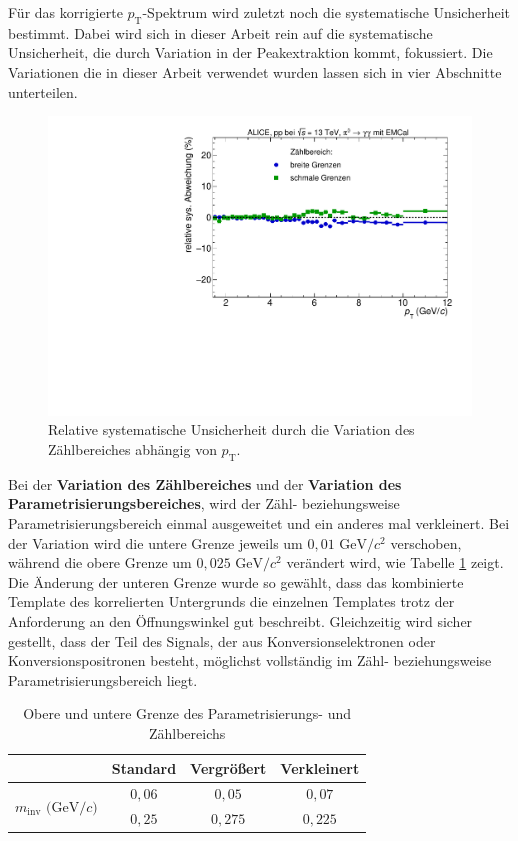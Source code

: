 Für das korrigierte $p_\text{T}$-Spektrum wird zuletzt noch die systematische Unsicherheit bestimmt.
Dabei wird sich in dieser Arbeit rein auf die systematische Unsicherheit, die durch Variation in der Peakextraktion kommt, fokussiert.
Die Variationen die in dieser Arbeit verwendet wurden lassen sich in vier Abschnitte unterteilen.
\begin{figure}[t!]
\centering
\includegraphics[width=.65\linewidth]{YieldsSysUncerIntRange_Data_2016.pdf}
\caption{Relative systematische Unsicherheit durch die Variation des Zählbereiches abhängig von $p_\text{T}$.}
\label{fig:IntSys}
\end{figure}
\newline
Bei der \textbf{Variation des Zählbereiches} und der \textbf{Variation des Parametrisierungsbereiches}, wird der Zähl- beziehungsweise Parametrisierungsbereich einmal ausgeweitet und ein anderes mal verkleinert.
Bei der Variation wird die untere Grenze jeweils um $0,01 \text{ GeV}/c^{2}$ verschoben, während die obere Grenze um $0,025 \text{ GeV}/c^{2}$ verändert wird, wie Tabelle \ref{tab:ParamAndIntRange} zeigt.
Die Änderung der unteren Grenze wurde so gewählt, dass das kombinierte Template des korrelierten Untergrunds die einzelnen Templates trotz der Anforderung an den Öffnungswinkel gut beschreibt.
Gleichzeitig wird sicher gestellt, dass der Teil des Signals, der aus Konversionselektronen oder Konversionspositronen besteht, möglichst vollständig im Zähl- beziehungsweise Parametrisierungsbereich liegt.
\begin{table}[b!]
\centering
\begin{tabular}{c|c||c||c|}
\cline{2-4}
                                                                      & Standard & Vergr{\"o}{\ss}ert & Verkleinert \\ \hline
\multicolumn{1}{|c|}{\multirow{2}{*}{$m_\text{inv}\text{ (GeV}/c)$}} & $0,06$   & $0,05$             & $0,07$      \\ \cline{2-4} 
\multicolumn{1}{|c|}{}                                                & $0,25$   & $0,275$            & $0,225$     \\ \hline
\end{tabular}
\caption{Obere und untere Grenze des Parametrisierungs- und Zählbereichs}
\label{tab:ParamAndIntRange}
\end{table}
